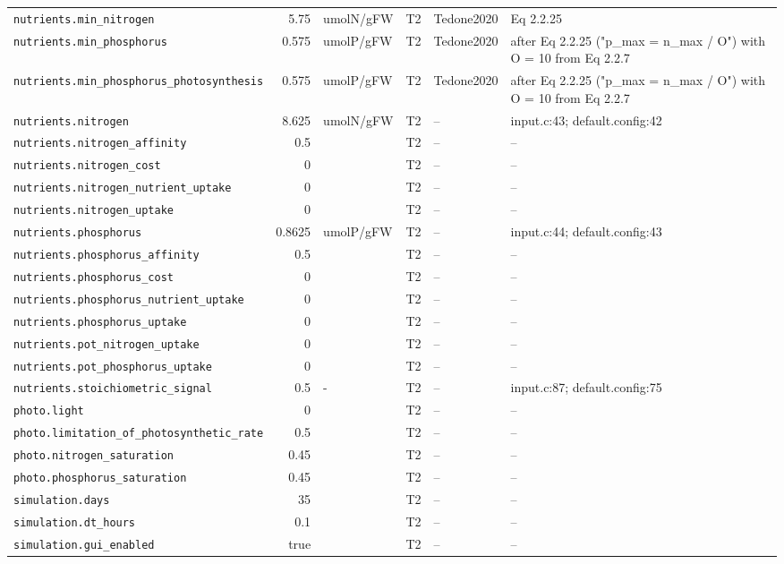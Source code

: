 \begin{table}[!htbp]
\begin{tabular}{@{}p{52mm}rp{20mm}cp{20mm}p{38mm}@{}}
\texttt{nutrients.min\_nitrogen} & 5.75 & umolN/gFW & T2 & Tedone2020 & Eq 2.2.25 \\
\texttt{nutrients.min\_phosphorus} & 0.575 & umolP/gFW & T2 & Tedone2020 & after Eq 2.2.25 ("p\_max = n\_max / O") with O = 10 from Eq 2.2.7 \\
\texttt{nutrients.min\_phosphorus\_photosynthesis} & 0.575 & umolP/gFW & T2 & Tedone2020 & after Eq 2.2.25 ("p\_max = n\_max / O") with O = 10 from Eq 2.2.7 \\
\texttt{nutrients.nitrogen} & 8.625 & umolN/gFW & T2 & -- & input.c:43; default.config:42 \\
\texttt{nutrients.nitrogen\_affinity} & 0.5 &  & T2 & -- & -- \\
\texttt{nutrients.nitrogen\_cost} & 0 &  & T2 & -- & -- \\
\texttt{nutrients.nitrogen\_nutrient\_uptake} & 0 &  & T2 & -- & -- \\
\texttt{nutrients.nitrogen\_uptake} & 0 &  & T2 & -- & -- \\
\texttt{nutrients.phosphorus} & 0.8625 & umolP/gFW & T2 & -- & input.c:44; default.config:43 \\
\texttt{nutrients.phosphorus\_affinity} & 0.5 &  & T2 & -- & -- \\
\texttt{nutrients.phosphorus\_cost} & 0 &  & T2 & -- & -- \\
\texttt{nutrients.phosphorus\_nutrient\_uptake} & 0 &  & T2 & -- & -- \\
\texttt{nutrients.phosphorus\_uptake} & 0 &  & T2 & -- & -- \\
\texttt{nutrients.pot\_nitrogen\_uptake} & 0 &  & T2 & -- & -- \\
\texttt{nutrients.pot\_phosphorus\_uptake} & 0 &  & T2 & -- & -- \\
\texttt{nutrients.stoichiometric\_signal} & 0.5 & - & T2 & -- & input.c:87; default.config:75 \\
\texttt{photo.light} & 0 &  & T2 & -- & -- \\
\texttt{photo.limitation\_of\_photosynthetic\_rate} & 0.5 &  & T2 & -- & -- \\
\texttt{photo.nitrogen\_saturation} & 0.45 &  & T2 & -- & -- \\
\texttt{photo.phosphorus\_saturation} & 0.45 &  & T2 & -- & -- \\
\texttt{simulation.days} & 35 &  & T2 & -- & -- \\
\texttt{simulation.dt\_hours} & 0.1 &  & T2 & -- & -- \\
\texttt{simulation.gui\_enabled} & true &  & T2 & -- & -- \\

\end{tabular}
\end{table}
